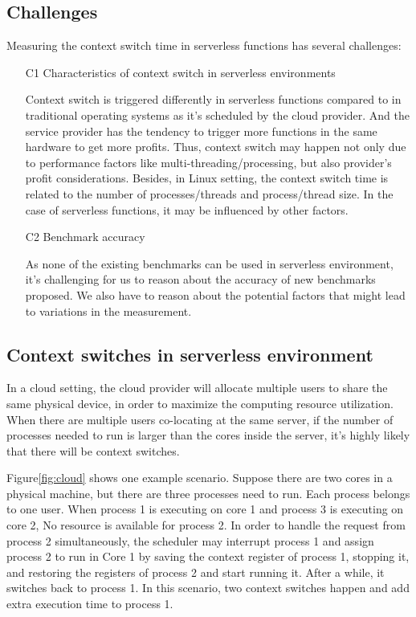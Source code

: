 


\subsection{Challenges}
Measuring the context switch time in serverless functions has several challenges:
\begin{itemize}
	\item [C1] Characteristics of context switch in serverless environments
	
	Context switch is triggered differently in serverless functions compared to in traditional operating systems as it's scheduled by the cloud provider.
	And the service provider has the tendency to trigger more functions in the same hardware to get more profits. 
	Thus, context switch may happen not only due to performance factors like multi-threading/processing, but also provider's profit considerations.
	Besides, in Linux setting, the context switch time is related to the number of processes/threads and process/thread size. 
	In the case of serverless functions, it may be influenced by other factors.
	
	\item [C2] Benchmark accuracy
	
	As none of the existing benchmarks can be used in serverless environment, 
	it's challenging for us to reason about the accuracy of new benchmarks proposed.
	We also have to reason about the potential factors that might lead to variations in the measurement.
\end{itemize}

\subsection{Context switches in serverless environment}
	In a cloud setting, the cloud provider will allocate multiple users to share the same physical device, in order to maximize the computing resource utilization.
	When there are multiple users co-locating at the same server, if the number of processes needed to run is larger than the cores inside the server, it's highly likely that there will be context switches. 
	
	Figure\ref{fig:cloud} shows one example scenario. Suppose there are two cores in a physical machine, but there are three processes need to run. 
	Each process belongs to one user. When process 1 is executing on core 1 and process 3 is executing on core 2, 
	No resource is available for process 2. In order to handle the request from process 2 simultaneously, the scheduler may interrupt process 1 and assign process 2 to run in Core 1 by saving the context register of process 1, stopping it, and restoring the registers of process 2 and start running it. 
	After a while, it switches back to process 1. In this scenario, two context switches happen and add extra execution time to process 1. 

